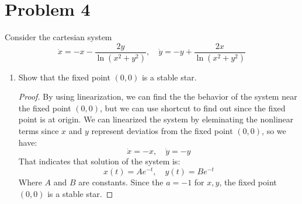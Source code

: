 \documentclass[12pt]{exam}
\begin{document}
\section*{Problem 4}
Consider the cartesian system
\[ \dot{x} = -x-\frac{2y}{\ln(x^2+y^2)}, \quad \dot{y} = -y+\frac{2x}{\ln(x^2+y^2)} \]

\begin{enumerate}
	\item Show that the fixed point $(0,0)$ is a stable star.
		\begin{proof}
			By using linearization, we can find the the behavior of the system near the fixed point $(0,0)$, but we can use shortcut to find out since the fixed point is at origin. We can linearized the system by eleminating the nonlinear terms since $x$ and $y$ represent deviatios from the fixed point $(0,0)$, so we have:
			\[ \dot{x} = -x, \quad \dot{y} = -y \]
			That indicates that solution of the system is:
			\[ x(t) = Ae^{-t}, \quad y(t) = Be^{-t} \]
			Where $A$ and $B$ are constants. Since the $a=-1$ for $x,y$, the fixed point $(0,0)$ is a stable star.
		\end{proof}
\end{enumerate}
\end{document}

